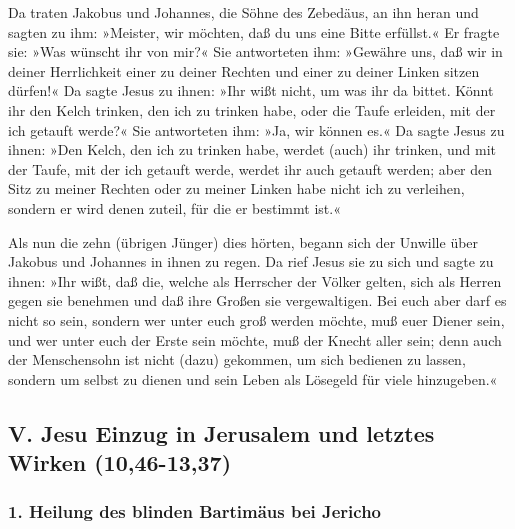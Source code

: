  Da traten Jakobus und Johannes, die Söhne des Zebedäus,
an ihn heran und sagten zu ihm: »Meister, wir möchten, daß du uns eine
Bitte erfüllst.«  Er fragte sie: »Was wünscht ihr von
mir?«  Sie antworteten ihm: »Gewähre uns, daß wir in
deiner Herrlichkeit einer zu deiner Rechten und einer zu deiner Linken
sitzen dürfen!«  Da sagte Jesus zu ihnen: »Ihr wißt
nicht, um was ihr da bittet. Könnt ihr den Kelch trinken, den ich zu
trinken habe, oder die Taufe erleiden, mit der ich getauft werde?«
 Sie antworteten ihm: »Ja, wir können es.« Da sagte Jesus
zu ihnen: »Den Kelch, den ich zu trinken habe, werdet (auch) ihr
trinken, und mit der Taufe, mit der ich getauft werde, werdet ihr auch
getauft werden;  aber den Sitz zu meiner Rechten oder zu
meiner Linken habe nicht ich zu verleihen, sondern er wird denen zuteil,
für die er bestimmt ist.«

 Als nun die zehn (übrigen Jünger) dies hörten, begann
sich der Unwille über Jakobus und Johannes in ihnen zu regen.
 Da rief Jesus sie zu sich und sagte zu ihnen: »Ihr wißt,
daß die, welche als Herrscher der Völker gelten, sich als Herren gegen
sie benehmen und daß ihre Großen sie vergewaltigen.  Bei
euch aber darf es nicht so sein, sondern wer unter euch groß werden
möchte, muß euer Diener sein,  und wer unter euch der
Erste sein möchte, muß der Knecht aller sein;  denn auch
der Menschensohn ist nicht (dazu) gekommen, um sich bedienen zu lassen,
sondern um selbst zu dienen und sein Leben als Lösegeld für viele
hinzugeben.«

\hypertarget{v.-jesu-einzug-in-jerusalem-und-letztes-wirken-1046-1337}{%
\subsection{V. Jesu Einzug in Jerusalem und letztes Wirken
(10,46-13,37)}\label{v.-jesu-einzug-in-jerusalem-und-letztes-wirken-1046-1337}}

\hypertarget{heilung-des-blinden-bartimuxe4us-bei-jericho}{%
\subsubsection{1. Heilung des blinden Bartimäus bei
Jericho}\label{heilung-des-blinden-bartimuxe4us-bei-jericho}}

